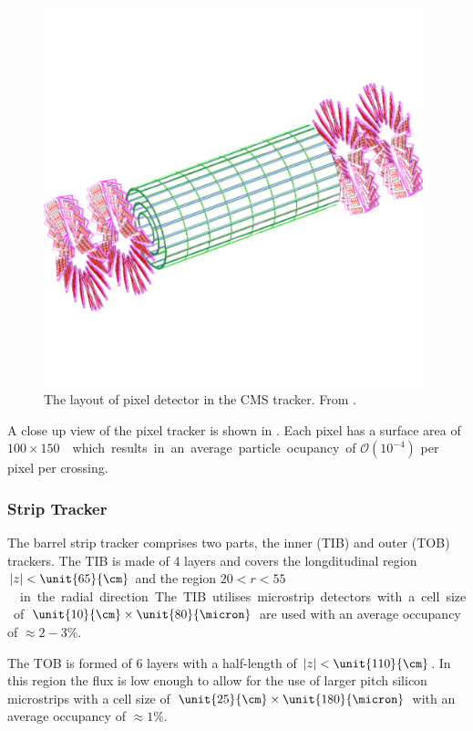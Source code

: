 \begin{figure}[htbp]
  \centering
  \includegraphics[width=0.98\textwidth]{pixel}
  \caption{The layout of pixel detector in the CMS tracker. From \cite{chatrchyan2008cms}.}
  \label{fig:pixel}
\end{figure}

A close up view of the pixel tracker is shown in .  
Each pixel has a surface area of \unit{$100\times150$}{\micron} which results in
an average particle ocupancy of $\mathcal{O}(10^{-4})$ per pixel per crossing.

\subsubsection{Strip Tracker}
The barrel strip tracker comprises two parts, the inner (TIB) and outer (TOB)
trackers.  The TIB is made of 4 layers and covers the longditudinal region $|z|
< \unit{65}{\cm}$ and the region \unit{$20<r<55$}{\cm} in the radial direction.
The TIB utilises microstrip detectors with a cell size of
$\unit{10}{\cm}\times\unit{80}{\micron}$ are used with an average occupancy of
$\approx\unit{2-3}{\%}$.

The TOB is formed of 6 layers with a half-length of $|z| < \unit{110}{\cm}$. In
this region the flux is low enough to allow for the use of larger pitch
silicon microstrips with a cell size of
$\unit{25}{\cm}\times\unit{180}{\micron}$ with an average occupancy of
$\approx\unit{1}{\%}$.

